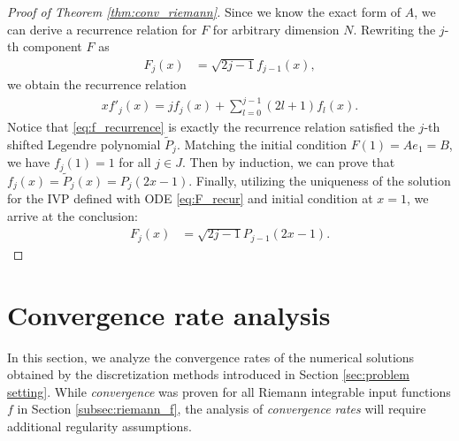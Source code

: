 \documentclass{article}
\theoremstyle{definition}
\begin{document}
\begin{proof} [Proof of Theorem \ref{thm:conv_riemann}]
    Since we know the exact form of $A$, we can derive a recurrence relation for $F$ for arbitrary dimension $N$. 
    Rewriting the $j$-th component $F$ as
    \begin{align*}
        F_j(x) &= \sqrt{2j-1}f_{j-1}(x),
    \end{align*}
    we obtain the recurrence relation 
    \begin{align} \label{eq:f_recurrence}
        xf'_j(x) = jf_j(x) + \sum_{l=0}^{j-1} (2l+1)f_{l}(x).
    \end{align}
    Notice that \eqref{eq:f_recurrence} is exactly the recurrence relation satisfied the $j$-th shifted Legendre polynomial $\tilde{P}_j$. 
    Matching the initial condition $F(1) = Ae_1 = B$, we have $f_j(1) = 1$ for all $j \in J$. Then by induction, we can prove that $f_j(x) = \tilde{P}_j(x) = P_j(2x-1)$.
    Finally, utilizing the uniqueness of the solution for the IVP defined with ODE \eqref{eq:F_recur} and initial condition at $x=1$, we arrive at the conclusion:
    \begin{align*}
        F_j(x) &= \sqrt{2j-1}P_{j-1}(2x-1).
    \end{align*}
\end{proof}


\section{Convergence rate analysis}
In this section, we analyze the convergence rates of the numerical solutions obtained by the discretization methods introduced in Section \ref{sec:problem setting}. While \emph{convergence} was proven for all Riemann integrable input functions $f$ in Section \ref{subsec:riemann_f}, the analysis of \emph{convergence rates} will require additional regularity assumptions.
\end{document}
